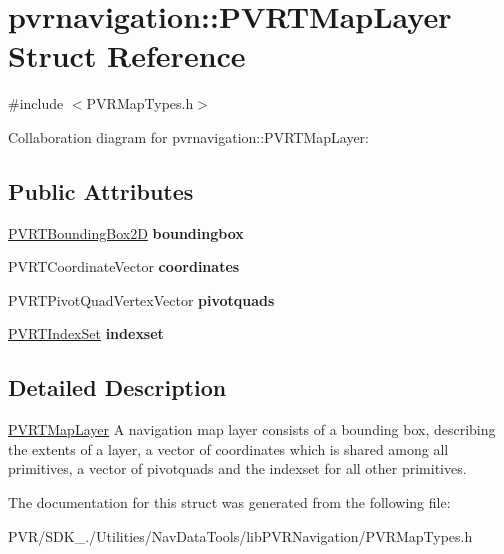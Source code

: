 \hypertarget{structpvrnavigation_1_1_p_v_r_t_map_layer}{\section{pvrnavigation\+:\+:P\+V\+R\+T\+Map\+Layer Struct Reference}
\label{structpvrnavigation_1_1_p_v_r_t_map_layer}
}


{\ttfamily \#include $<$P\+V\+R\+Map\+Types.\+h$>$}



Collaboration diagram for pvrnavigation\+:\+:P\+V\+R\+T\+Map\+Layer\+:
\subsection*{Public Attributes}
\begin{DoxyCompactItemize}
\item 
\hypertarget{structpvrnavigation_1_1_p_v_r_t_map_layer_a84ddd30ab6f8257349cb07b63161a833}{\hyperlink{structpvrnavigation_1_1_p_v_r_t_bounding_box2_d}{P\+V\+R\+T\+Bounding\+Box2\+D} {\bfseries boundingbox}}\label{structpvrnavigation_1_1_p_v_r_t_map_layer_a84ddd30ab6f8257349cb07b63161a833}

\item 
\hypertarget{structpvrnavigation_1_1_p_v_r_t_map_layer_a6e593f0121385a1c39f82c6ad17d4d4e}{P\+V\+R\+T\+Coordinate\+Vector {\bfseries coordinates}}\label{structpvrnavigation_1_1_p_v_r_t_map_layer_a6e593f0121385a1c39f82c6ad17d4d4e}

\item 
\hypertarget{structpvrnavigation_1_1_p_v_r_t_map_layer_a284a54feab2648d2217894b0befa078f}{P\+V\+R\+T\+Pivot\+Quad\+Vertex\+Vector {\bfseries pivotquads}}\label{structpvrnavigation_1_1_p_v_r_t_map_layer_a284a54feab2648d2217894b0befa078f}

\item 
\hypertarget{structpvrnavigation_1_1_p_v_r_t_map_layer_a27194365c20d73acea29d3e74477523f}{\hyperlink{structpvrnavigation_1_1_p_v_r_t_index_set}{P\+V\+R\+T\+Index\+Set} {\bfseries indexset}}\label{structpvrnavigation_1_1_p_v_r_t_map_layer_a27194365c20d73acea29d3e74477523f}

\end{DoxyCompactItemize}


\subsection{Detailed Description}


  \hyperlink{structpvrnavigation_1_1_p_v_r_t_map_layer}{P\+V\+R\+T\+Map\+Layer}  A navigation map layer consists of a bounding box, describing the extents of a layer, a vector of coordinates which is shared among all primitives, a vector of pivotquads and the indexset for all other primitives. 

The documentation for this struct was generated from the following file\+:\begin{DoxyCompactItemize}
\item 
P\+V\+R/\+S\+D\+K\+\_./\+Utilities/\+Nav\+Data\+Tools/lib\+P\+V\+R\+Navigation/P\+V\+R\+Map\+Types.\+h\end{DoxyCompactItemize}
